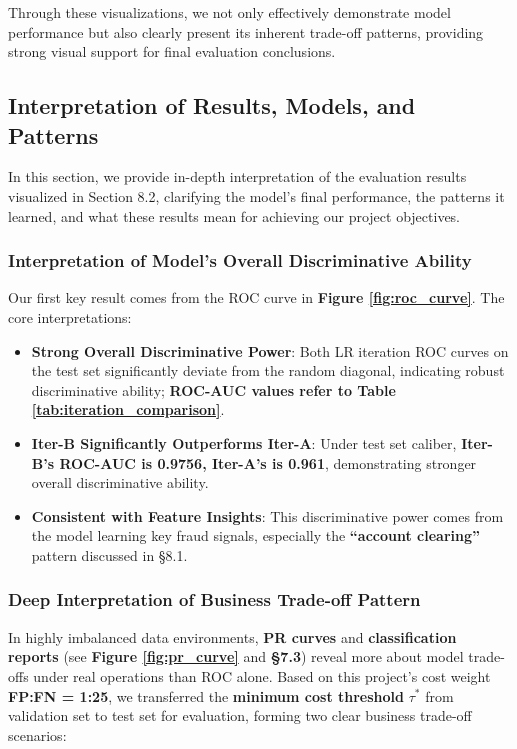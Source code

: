 \documentclass[sigplan,screen]{acmart}
\begin{document}
Through these visualizations, we not only effectively demonstrate model performance but also clearly present its inherent trade-off patterns, providing strong visual support for final evaluation conclusions.

\subsection{Interpretation of Results, Models, and Patterns}

In this section, we provide in-depth interpretation of the evaluation results visualized in Section 8.2, clarifying the model's final performance, the patterns it learned, and what these results mean for achieving our project objectives.

\subsubsection{Interpretation of Model's Overall Discriminative Ability}

Our first key result comes from the ROC curve in \textbf{Figure \ref{fig:roc_curve}}. The core interpretations:

\begin{itemize}
\item \textbf{Strong Overall Discriminative Power}: Both LR iteration ROC curves on the test set significantly deviate from the random diagonal, indicating robust discriminative ability; \textbf{ROC-AUC values refer to Table \ref{tab:iteration_comparison}}.
\item \textbf{Iter-B Significantly Outperforms Iter-A}: Under test set caliber, \textbf{Iter-B's ROC-AUC is 0.9756, Iter-A's is 0.961}, demonstrating stronger overall discriminative ability.
\item \textbf{Consistent with Feature Insights}: This discriminative power comes from the model learning key fraud signals, especially the \textbf{``account clearing''} pattern discussed in \S8.1.
\end{itemize}

\subsubsection{Deep Interpretation of Business Trade-off Pattern}

In highly imbalanced data environments, \textbf{PR curves} and \textbf{classification reports} (see \textbf{Figure \ref{fig:pr_curve}} and \textbf{\S7.3}) reveal more about model trade-offs under real operations than ROC alone. Based on this project's cost weight \textbf{FP:FN = 1:25}, we transferred the \textbf{minimum cost threshold} $\tau^*$ from validation set to test set for evaluation, forming two clear business trade-off scenarios:
\end{document}
